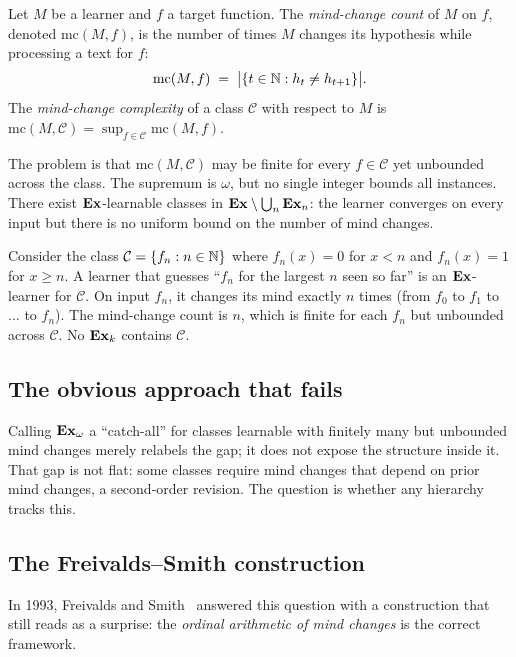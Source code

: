 \begin{defn}
\label{def:mc-count}
Let $M$ be a learner and $f$ a target function.  The \emph{mind-change
count} of $M$ on $f$, denoted $\mathrm{mc}(M, f)$, is the number of
times $M$ changes its hypothesis while processing a text for $f$:
\[
  \mathrm{mc}(M, f) \;=\; \bigl|\{t \in \mathbb{N} : h_t \neq h_{t+1}\}\bigr|.
\]
The \emph{mind-change complexity} of a class $\mathcal{C}$ with respect
to $M$ is $\mathrm{mc}(M, \mathcal{C}) = \sup_{f \in \mathcal{C}}
\mathrm{mc}(M, f)$.
\end{defn}

The problem is that $\mathrm{mc}(M, \mathcal{C})$ may be finite for every
$f \in \mathcal{C}$ yet unbounded across the class.  The supremum is
$\omega$, but no single integer bounds all instances.  There exist
$\mathbf{Ex}$-learnable classes in $\mathbf{Ex} \setminus \bigcup_n \mathbf{Ex}_n$: the learner
converges on every input but there is no uniform bound on the number of
mind changes.

\begin{computational}
Consider the class $\mathcal{C} = \{f_n : n \in \mathbb{N}\}$ where $f_n(x) = 0$
for $x < n$ and $f_n(x) = 1$ for $x \geq n$.  A learner that guesses
``$f_n$ for the largest $n$ seen so far'' is an $\mathbf{Ex}$-learner for
$\mathcal{C}$.  On input $f_n$, it changes its mind exactly $n$ times
(from $f_0$ to $f_1$ to $\ldots$ to $f_n$).  The mind-change count is
$n$, which is finite for each $f_n$ but unbounded across $\mathcal{C}$.
No $\mathbf{Ex}_k$ contains $\mathcal{C}$.
\end{computational}

\subsection*{The obvious approach that fails}

Calling $\mathbf{Ex}_\omega$ a ``catch-all'' for classes learnable with finitely
many but unbounded mind changes merely relabels the gap; it does not expose
the structure inside it.  That gap is not flat: some classes require mind
changes that depend on prior mind changes, a second-order revision.
The question is whether any hierarchy tracks this.

\subsection*{The Freivalds--Smith construction}

In 1993, Freivalds and Smith~\cite{FreivaldsSmith1993} answered this
question with a construction that still reads as a surprise: the
\emph{ordinal arithmetic of mind changes} is the correct framework.

